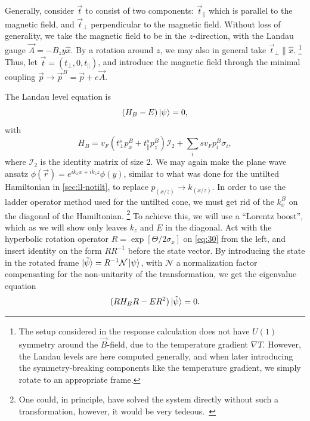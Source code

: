 Generally, consider \( \vec{t} \) to  consist of two components: \( \vec{t}_{\parallel} \) which is parallel to the magnetic field, and \( \vec{t}_{\perp} \) perpendicular to the magnetic field.
Without loss of generality, we take the magnetic field to be in the \( z \)-direction, with the Landau gauge \( \vec{A} = - B_z y \hat{x} \).
By a rotation around \( z \), we may also in general take \( \vec{t}_{\perp} \parallel \hat{x} \).%
\footnote{
  The setup considered in the response calculation does not have \( U(1) \) symmetry around the \( \vec{B} \)-field, due to the temperature gradient \( \nabla T \).
  However, the Landau levels are here computed generally, and when later introducing the symmetry-breaking components like the temperature gradient, we simply rotate to an appropriate frame.
}
Thus, let \( \vec{t} = (t_{\perp}, 0, t_{\parallel}) \), and introduce the magnetic field through the minimal coupling \( \vec{p} \to \vec{p}^B = \vec{p} + e \vec{A} \).

The Landau level equation is
\begin{equation}
  \label{eq:30}
  \left(H_{B} - E\right) \ket{\psi } = 0,
\end{equation}
with
\begin{equation}
  \label{eq:31}
  H_{B} = v_F \left(t^s _{\perp} p^B_{x} + t^s _{\parallel} p^B_{z} \right) \mathcal{I}_2 + \sum_i s v_{F} p^B_{i} \sigma _{i},
\end{equation}
where \(\mathcal{I}_{2}\) is the identity matrix of size 2.
We may again make the plane wave ansatz \( \phi(\vec{r}) = e^{i k_x x + i k_z z} \phi(y) \), similar to what was done for the untilted Hamiltonian in \cref{sec:ll-notilt}, to replace \( p_{(x /z)} \to k_{(x /z)} \).
In order to use the ladder operator method used for the untilted cone, we must get rid of the \(k^B_{x}\) on the diagonal of the Hamiltonian.%
\footnote{One could, in principle, have solved the system directly without such a transformation, however, it would be very tedeous.~\cite{tchoumakovMagneticFieldInducedRelativisticProperties2016}}
To achieve this, we will use a ``Lorentz boost'', which as we will show only leaves \(k_{z}\) and \(E\) in the diagonal.
Act with the hyperbolic rotation operator \(R = \exp[\Theta /2 \sigma_{x}]\) on \cref{eq:30} from the left, and insert identity on the form \( R R^{-1} \) before the state vector.
By introducing the state in the rotated frame \(\ket{\tilde{\psi}} = R^{-1} \mathcal{N} \ket{\psi } \), with \(\mathcal{N}\) a normalization factor compensating for the non-unitarity of the transformation, we get the eigenvalue equation
\begin{equation}
  \label{eq:32}
  (R H_{B} R - E R^2) \ket{\tilde{\psi}} = 0.
\end{equation}

